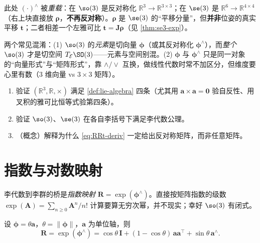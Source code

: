 \begin{note}
此处 $(\cdot)^\wedge$ 被\emph{重载}：在 $\so(3)$ 是反对称化 $\mathbb{R}^3\to\mathbb{R}^{3\times3}$；在 $\se(3)$ 是 $\mathbb{R}^6\to\mathbb{R}^{4\times4}$（右上块直接放 $\boldsymbol{\rho}$，\textbf{不再反对称}）。$\boldsymbol{\rho}$ 是 $\se(3)$ 的“平移分量”，但\textbf{并非}位姿的真实平移 $\mathbf{t}$；二者相差一个左雅可比 $\mathbf{t}=\mathbf{J}\boldsymbol{\rho}$（见 \cref{thm:se3-exp}）。
\end{note}

\begin{pitfall}
两个常见混淆：(1) $\so(3)$ 的\emph{元素}是切向量 $\boldsymbol{\phi}$（或其反对称化 $\boldsymbol{\phi}^\wedge$），而\emph{整个} $\so(3)$ 才是切空间 $T_{\mathcal{E}}\SO(3)$——元素与空间别混。(2) $\boldsymbol{\phi}$ 与 $\boldsymbol{\phi}^\wedge$ 只是同一对象的“向量形式”与“矩阵形式”，靠 $\wedge/\vee$ 互换，做线性代数时常不加区分，但维度要心里有数（$3$ 维向量 vs $3\times3$ 矩阵）。
\end{pitfall}

\begin{practice}
\begin{enumerate}
  \item 验证 $(\mathbb{R}^3,\mathbb{R},\times)$ 满足 \cref{def:lie-algebra} 四条（尤其用 $\mathbf{a}\times\mathbf{a}=\mathbf{0}$ 验自反性、用叉积的雅可比恒等式验第四条）。
  \item 验证 $\so(3)$、$\se(3)$ 在各自李括号下满足李代数公理。
  \item （概念）解释为什么 \cref{eq:RRt-deriv} 一定给出反对称矩阵，而非任意矩阵。
\end{enumerate}
\end{practice}

\section{指数与对数映射}
\label{sec:exp-log}

李代数到李群的桥是\emph{指数映射} $\mathbf{R}=\exp(\boldsymbol{\phi}^\wedge)$。直接按矩阵指数的级数 $\exp(\mathbf{A})=\sum_{n\ge0}\mathbf{A}^n/n!$ 计算要算无穷次幂，并不现实；幸好 $\so(3)$ 有闭式。

\begin{theorem}\label{thm:so3-exp}
设 $\boldsymbol{\phi}=\theta\mathbf{a}$，$\theta=\|\boldsymbol{\phi}\|$，$\mathbf{a}$ 为单位轴，则
\begin{equation}
  \mathbf{R}=\exp(\boldsymbol{\phi}^\wedge)=\cos\theta\,\mathbf{I}+(1-\cos\theta)\,\mathbf{a}\mathbf{a}^\top+\sin\theta\,\mathbf{a}^\wedge.
  \label{eq:rodrigues}
\end{equation}
\end{theorem}

